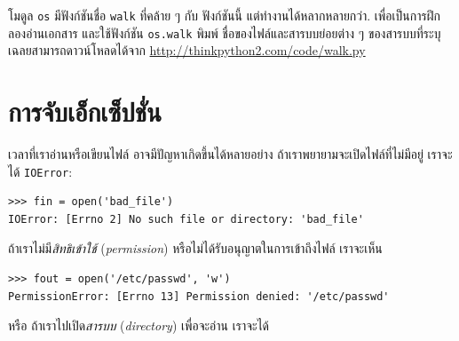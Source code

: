 
โมดูล \texttt{os} มีฟังก์ชันชื่อ \texttt{walk} ที่คล้าย ๆ กับ ฟังก์ชันนี้ แต่ทำงานได้หลากหลายกว่า.
เพื่อเป็นการฝึก
ลองอ่านเอกสาร และใช้ฟังก์ชัน \texttt{os.walk} พิมพ์ ชื่อของไฟล์และสารบบย่อยต่าง ๆ ของสารบบที่ระบุ
เฉลยสามารถดาวน์โหลดได้จาก
\url{http://thinkpython2.com/code/walk.py}

\section{การจับเอ็กเซ็ปชั่น}
\label{catch}


เวลาที่เราอ่านหรือเขียนไฟล์ อาจมีปัญหาเกิดขึ้นได้หลายอย่าง
ถ้าเราพยายามจะเปิดไฟล์ที่ไม่มีอยู่ เราจะได้ \texttt{IOError}:

\begin{verbatim}
>>> fin = open('bad_file')
IOError: [Errno 2] No such file or directory: 'bad_file'
\end{verbatim}
%
%
ถ้าเราไม่มี\textit{สิทธิเข้าใช้} (\textit{permission}) หรือไม่ได้รับอนุญาตในการเข้าถึงไฟล์
เราจะเห็น

\begin{verbatim}
>>> fout = open('/etc/passwd', 'w')
PermissionError: [Errno 13] Permission denied: '/etc/passwd'
\end{verbatim}
%
%
หรือ ถ้าเราไปเปิด\textit{สารบบ} (\textit{directory}) เพื่อจะอ่าน
เราจะได้


